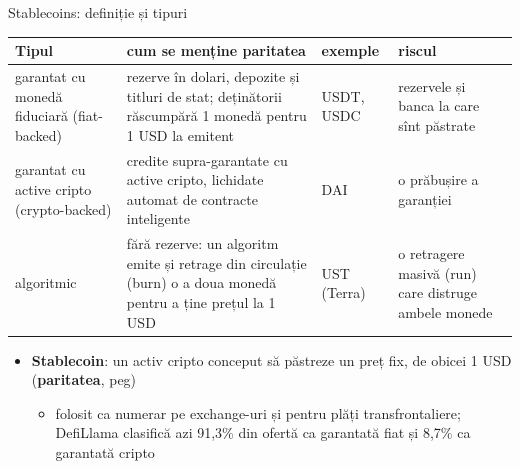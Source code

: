 \begin{frame}{Stablecoins: definiție și tipuri}
\itemsize{\footnotesize}
\begin{center}
\scriptsize
\begin{tabular}{>{\raggedright\arraybackslash}p{2.2cm}>{\raggedright\arraybackslash}p{4.4cm}>{\raggedright\arraybackslash}p{2.0cm}>{\raggedright\arraybackslash}p{2.4cm}}
\toprule
Tipul & cum se menține paritatea & exemple & riscul \\
\midrule
garantat cu monedă fiduciară (fiat-backed) & rezerve în dolari, depozite și titluri de stat; deținătorii răscumpără 1 monedă pentru 1 USD la emitent & USDT, USDC & rezervele și banca la care sînt păstrate \\
garantat cu active cripto (crypto-backed) & credite supra-garantate cu active cripto, lichidate automat de contracte inteligente & DAI & o prăbușire a garanției \\
algoritmic & fără rezerve: un algoritm emite și retrage din circulație (burn) o a doua monedă pentru a ține prețul la 1 USD & UST (Terra) & o retragere masivă (run) care distruge ambele monede \\
\bottomrule
\end{tabular}
\end{center}
\begin{itemize}
    \item \textbf{Stablecoin}: un activ cripto conceput să păstreze un preț fix, de obicei 1 USD (\textbf{paritatea}, peg)
    \begin{itemize}
        \item folosit ca numerar pe exchange-uri și pentru plăți transfrontaliere; DefiLlama clasifică azi 91{,}3\% din ofertă ca garantată fiat și 8{,}7\% ca garantată cripto
    \end{itemize}
\end{itemize}
\end{frame}

